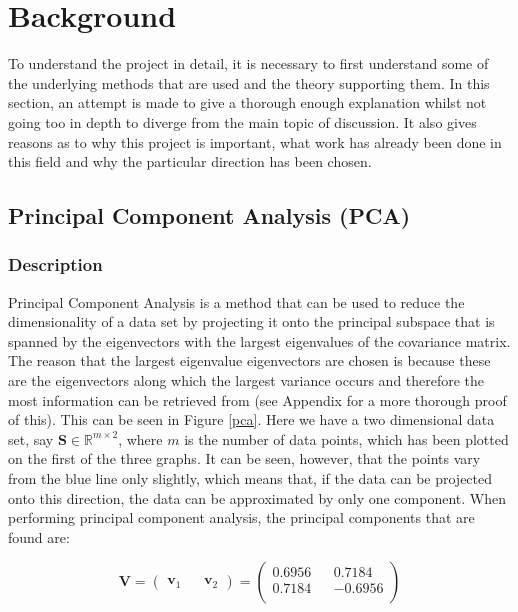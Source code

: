 \documentclass[11pt,a4paper]{article}
\begin{document}
\section{Background}
To understand the project in detail, it is necessary to first understand some of the underlying methods that are used and the theory supporting them. In this section, an attempt is made to give a thorough enough explanation whilst not going too in depth to diverge from the main topic of discussion. It also gives reasons as to why this project is important, what work has already been done in this field and why the particular direction has been chosen. 




\subsection{Principal Component Analysis (PCA)}
\subsubsection{Description}
Principal Component Analysis is a method that can be used to reduce the dimensionality of a data set by projecting it onto the principal subspace that is spanned by the eigenvectors with the largest eigenvalues of the covariance matrix. The reason that the largest eigenvalue eigenvectors are chosen is because these are the eigenvectors along which the largest variance occurs and therefore the most information can be retrieved from (see Appendix for a more thorough proof of this). This can be seen in Figure \ref{pca}. Here we have a two dimensional data set, say $\mathbf{S} \in \mathbb{R}^{m \times 2}$, where $m$ is the number of data points, which has been plotted on the first of the three graphs. It can be seen, however, that the points vary from the blue line only slightly, which means that, if the data can be projected onto this direction, the data can be approximated by only one component. When performing principal component analysis, the principal components that are found are:

\begin{equation*}
\mathbf{V} = 
\begin{pmatrix}
\mathbf{v}_1 && \mathbf{v}_2
\end{pmatrix} = 
\begin{pmatrix}
0.6956 && 0.7184\\
 0.7184 && -0.6956\\

\end{pmatrix}
\end{equation*}
\end{document}
